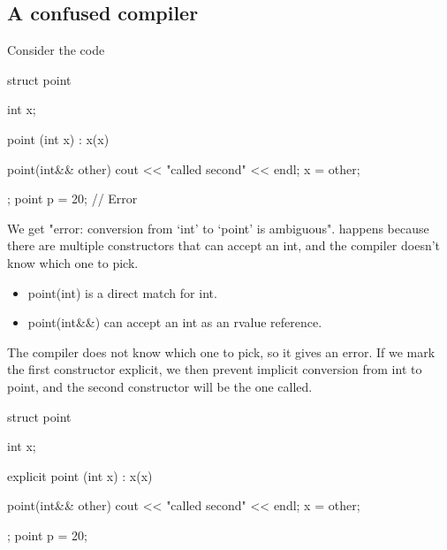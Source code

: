 \documentclass{report}
\begin{document}
    \subsection{A confused compiler}
    \bigbreak \noindent 
    Consider the code
    \bigbreak \noindent 
    \begin{cppcode}
        struct  point {
            int x{};

            point (int x) : x(x) {}

            point(int&& other) {
                cout << "called second" << endl;
                x = other;
            }
        };
        point p = 20; // Error
    \end{cppcode}
    \bigbreak \noindent 
    We get "error: conversion from ‘int’ to ‘point’ is ambiguous".
    \bigbreak \noindent 
    happens because there are multiple constructors that can accept an int, and the compiler doesn't know which one to pick.
    \bigbreak \noindent 
    \begin{itemize}
        \item point(int) is a direct match for int.
        \item point(int\&\&) can accept an int as an rvalue reference.
    \end{itemize}
    The compiler does not know which one to pick, so it gives an error.
    \bigbreak \noindent 
    If we mark the first constructor explicit, we then prevent implicit conversion from int to point, and the second constructor will be the one called.
    \bigbreak \noindent 
    \begin{cppcode}
        struct  point {
            int x{};

            explicit point (int x) : x(x) {}

            point(int&& other) {
                cout << "called second" << endl;
                x = other;
            }
        };
        point p = 20;
    \end{cppcode}

    \bigbreak \noindent 
\end{document}
